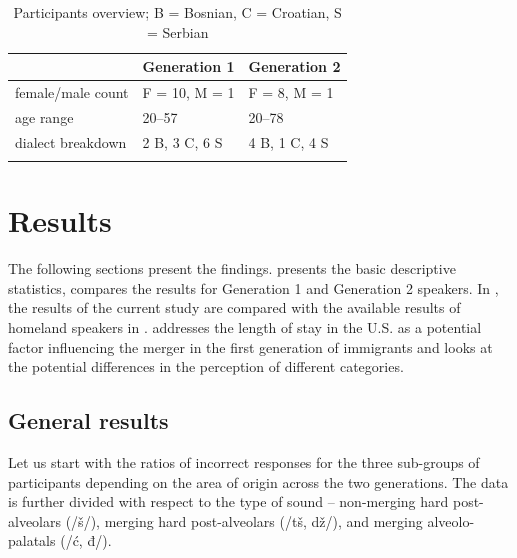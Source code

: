 \documentclass[output=paper,
modfonts,
newtxmath,
hidelinks,
]{langscibook}
\begin{document}
\begin{table}
\begin{tabularx}{\textwidth}{XXl}
\lsptoprule
&  \textbf{Generation 1} &  \textbf{Generation 2}\\
\midrule
female/male count & F = 10, M = 1 & F = 8, M = 1\\
age range & 20--57 & 20--78\\
dialect breakdown & 2 B, 3 C, 6 S & 4 B, 1 C, 4 S\\
\lspbottomrule
\end{tabularx}
\caption{\label{tab:mihajlovic:4} Participants overview; B = Bosnian, C = Croatian, S = Serbian}
\end{table}

\section{Results}\label{sec:mihajlovic:5}

The following sections present the findings.  presents the basic descriptive statistics,  compares the results for Generation 1 and Generation 2 speakers. In , the results of the current study are compared with the available results of homeland speakers in \citet{Cavar-Hamann2011}.  addresses the length of stay in the U.S. as a potential factor influencing the merger in the first generation of immigrants and  looks at the potential differences in the perception of different categories.


\subsection{General results}\label{sec:mihajlovic:5.1}

Let us start with the ratios of incorrect responses for the three sub-groups of participants depending on the area of origin across the two generations. The data is further divided with respect to the type of sound – non-merging hard post-alveolars (/š/), merging hard post-alveolars (/tš, dž/), and merging alveolo-palatals (/ć, đ/).
\end{document}
